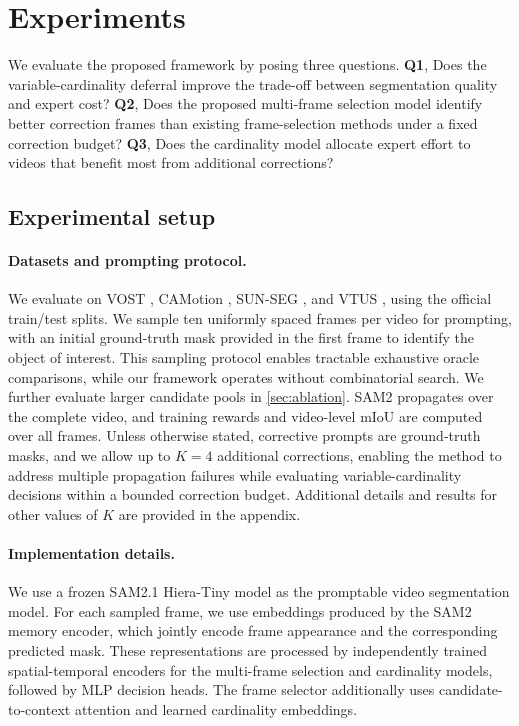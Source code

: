 \section{Experiments}
\label{sec:experiments}
We evaluate the proposed framework by posing three questions.
\textbf{Q1}, Does the variable-cardinality deferral improve the trade-off between segmentation quality and expert cost?
\textbf{Q2}, Does the proposed multi-frame selection model identify better correction frames than existing frame-selection methods under a fixed correction budget?
\textbf{Q3}, Does the cardinality model allocate expert effort to videos that benefit most from additional corrections?

\subsection{Experimental setup}
\label{sec:experimental_setup}

\paragraph{Datasets and prompting protocol.}
We evaluate on VOST \cite{tokmakov2023breaking}, CAMotion
\cite{yao2026camotion}, SUN-SEG \cite{ji2022vps}, and VTUS
\cite{yang2024vivim}, using the official train/test splits.
We sample ten uniformly spaced frames per video for prompting, with an initial ground-truth mask provided in the first frame to identify the object of interest. This sampling protocol enables tractable exhaustive oracle comparisons, while our framework operates without combinatorial search. We further evaluate larger candidate pools in \ref{sec:ablation}.
SAM2 propagates over the complete video, and training rewards
and video-level mIoU are computed over all frames.
Unless otherwise stated, corrective prompts are ground-truth
masks, and we allow up to $K=4$ 
additional corrections,
enabling the method to address multiple propagation failures
while evaluating variable-cardinality decisions within a
bounded correction budget.
Additional details and results for other values of $K$
are provided in the appendix.

\paragraph{Implementation details.}
We use a frozen SAM2.1 Hiera-Tiny model \cite{ravi2025sam} as the
promptable video segmentation model. For each sampled frame, we use
embeddings produced by the SAM2 memory encoder, which jointly encode
frame appearance and the corresponding predicted mask.
These representations are processed by independently trained
spatial-temporal encoders for the multi-frame selection and
cardinality models, followed by MLP decision heads.
The frame selector additionally uses candidate-to-context attention
and learned cardinality embeddings.

